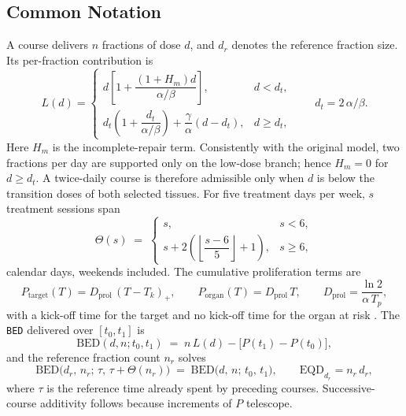\documentclass[preprint,12pt,number]{elsarticle}
\begin{document}
\subsection*{Common Notation}
A course delivers $n$ fractions of dose $d$, and $d_r$ denotes the reference fraction size. Its per-fraction contribution is 
    \begin{equation}
    L(d)=
    \begin{cases}
    d\left[1+\dfrac{(1+H_m)d}{\alpha/\beta}\right],
      & d<d_t,\\[1ex]
    d_t\left(1+\dfrac{d_t}{\alpha/\beta}\right)
      +\dfrac{\gamma}{\alpha}(d-d_t),
      & d\geq d_t,
    \end{cases}
    \qquad d_t=2\,\alpha/\beta .
    \label{eq:response}
    \end{equation}
Here $H_m$ is the incomplete-repair term. Consistently with the original model, two fractions per day are supported only on the low-dose branch; hence $H_m=0$
for $d\geq d_t$. A twice-daily course is therefore admissible only when $d$ is below the transition doses of both selected tissues. For five treatment days per week, $s$ treatment sessions span
    \begin{equation}
    \Theta(s) \;=\;
    \begin{cases}
    s, & s < 6,\\[0.6ex]
    s + 2\left(\left\lfloor \dfrac{s-6}{5} \right\rfloor + 1\right), & s \geq 6,
    \end{cases}
    \label{eq:calendar}
    \end{equation}
calendar days, weekends included. The cumulative proliferation terms are
    \begin{equation}
    P_\mathrm{target}(T) = D_\mathrm{prol}\,(T - T_k)_{+},    \qquad    P_\mathrm{organ}(T) = D_\mathrm{prol}\,T ,    \qquad    D_\mathrm{prol} = \frac{\ln 2}{\alpha\,T_p},
    \label{eq:loss}
    \end{equation}
with a kick-off time for the target and no kick-off time for the organ at risk \cite{vandyk1989}. The \texttt{BED} delivered over $[t_0,t_1]$ is
    \begin{equation}
    \mathrm{BED}(d, n; t_0, t_1) \;=\; n\,L(d) - \big[P(t_1) - P(t_0)\big],
    \label{eq:bed}
    \end{equation}
and the reference fraction count $n_r$ solves
    \begin{equation}
    \mathrm{BED}\big(d_r,\,n_r;\,\tau,\,\tau + \Theta(n_r)\big)     \;=\; \mathrm{BED}\big(d,\,n;\,t_0,\,t_1\big),    \qquad    \mathrm{EQD}_{d_r} = n_r\,d_r ,
    \label{eq:core}
    \end{equation}
where $\tau$ is the reference time already spent by preceding courses. Successive-course additivity follows because increments of $P$ telescope.
\end{document}

